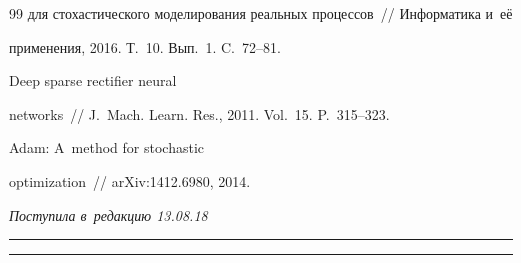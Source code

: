 {{\begin{thebibliography}{99}
для стохастического моделирования реальных процессов~/\!\!/ Информатика и~её 


применения, 2016. Т.~10. Вып.~1. C.~72--81. 







 Deep sparse rectifier neural 


networks~/\!\!/ J.~Mach. Learn. Res., 2011. Vol.~15. P.~315--323.







 Adam: A~method for stochastic 


optimization~/\!\!/ arXiv:1412.6980, 2014.


        \end{thebibliography}


} }








\vspace*{-3pt}





\hfill{\small\textit{Поступила в~редакцию 13.08.18}}














\vspace*{8pt}





\hrule





\vspace*{2pt}















\hrule





